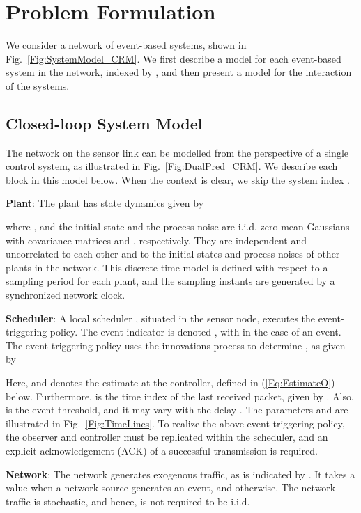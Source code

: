 \documentclass[twocolumn]{autart}
\begin{document}
\section{Problem Formulation} \label{S:ProbForm}

We consider a network of  event-based systems, shown in Fig.~\ref{Fig:SystemModel_CRM}. We first describe a model for each event-based system in the network, indexed by , and then present a model for the interaction of the  systems.

\subsection{Closed-loop System Model}
The network on the sensor link can be modelled from the perspective of a single control system, as illustrated in Fig.~\ref{Fig:DualPred_CRM}. We describe each block in this model below. When the context is clear, we skip the system index .

\noindent \textbf{Plant}: The plant  has state dynamics given by

where ,  and the initial state  and the process noise  are i.i.d. zero-mean Gaussians with covariance matrices  and , respectively. They are independent and uncorrelated to each other and to the initial states and process noises of other plants in the network. This discrete time model is defined with respect to a sampling period  for each plant, and the sampling instants are generated by a synchronized network clock.

\noindent \textbf{Scheduler}: A local scheduler , situated in the sensor node, executes the event-triggering policy. The event indicator is denoted , with  in the case of an event. The event-triggering policy uses the innovations process to determine , as given by

Here,  and  denotes the estimate at the controller, defined in (\ref{Eq:EstimateO}) below. Furthermore,  is the time index of the last received packet, given by . Also,  is the event threshold, and it may vary with the delay . The parameters  and  are illustrated in Fig.~\ref{Fig:TimeLines}. To realize the above event-triggering policy, the observer and controller must be replicated within the scheduler, and an explicit acknowledgement (ACK) of a successful transmission is required.

\noindent \textbf{Network}: The network  generates exogenous traffic, as is indicated by . It takes a value  when a network source generates an event, and  otherwise. The network traffic is stochastic, and hence,  is not required to be i.i.d.
\end{document}
